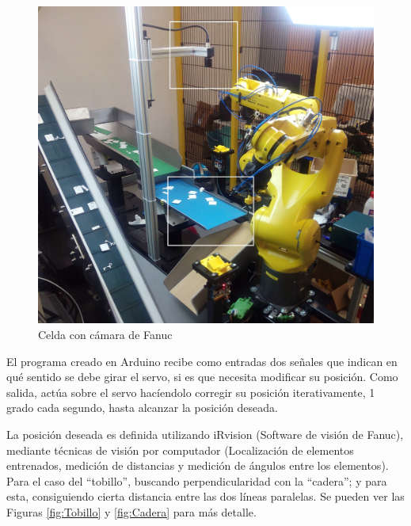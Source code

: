 \begin{figure}
\centering
\includegraphics[width=120mm]{Figures/CeldaFanuc}
\caption[Celda con cámara de Fanuc]{Celda con cámara de Fanuc}
\label{fig:CeldaFanuc}
\end{figure}

El programa creado en Arduino recibe como entradas dos señales que indican en qué sentido se debe girar el servo, si es que necesita modificar su posición. Como salida, actúa sobre el servo hacíendolo corregir su posición iterativamente, 1 grado cada segundo, hasta alcanzar la posición deseada.

La posición deseada es definida utilizando iRvision (Software de visión de Fanuc), mediante técnicas de visión por computador (Localización de elementos entrenados, medición de distancias y medición de ángulos entre los elementos). Para el caso del ``tobillo'', buscando perpendicularidad con la ``cadera''; y para esta, consiguiendo cierta distancia entre las dos líneas paralelas. Se pueden ver las Figuras \ref{fig:Tobillo} y \ref{fig:Cadera} para más detalle.

